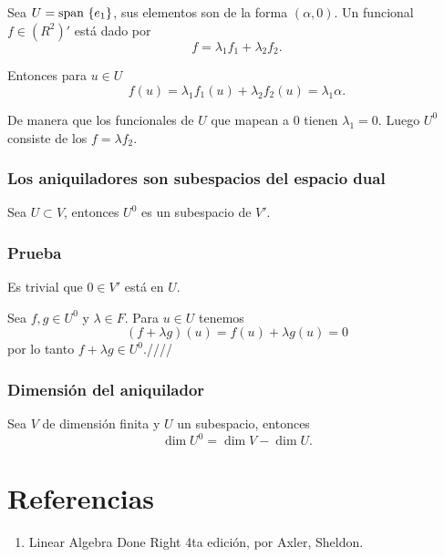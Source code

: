 \documentclass{article}
\begin{document}
Sea $U=\text{span }\{e_1\}$, sus elementos son de la forma $(\alpha,0)$.
Un funcional $f\in (R^2)'$ está dado por
$$f=\lambda_1 f_1 + \lambda_2 f_2.$$

Entonces para $u\in U$
$$f(u)=\lambda_1 f_1(u) + \lambda_2 f_2(u) = \lambda_1\alpha.$$

De manera que los funcionales de $U$ que mapean a $0$ tienen 
$\lambda_1=0$. Luego $U^0$ consiste de los $f=\lambda f_2$.
\newpage

\subsubsection{Los aniquiladores son subespacios del espacio dual}
Sea $U\subset V$, entonces $U^0$ es un subespacio de $V'$.
\subsubsection*{Prueba}
Es trivial que $0\in V'$ está en $U$.

Sea $f,g\in U^0$ y $\lambda\in F$. Para $u\in U$ tenemos
$$(f+\lambda g)(u)=f(u)+\lambda g(u) = 0$$
por lo tanto $f+\lambda g \in U^0$.\hfill ////

\subsubsection{Dimensión del aniquilador}
Sea $V$ de dimensión finita y $U$ un subespacio, entonces
$$\dim U^0 = \dim V - \dim U.$$

\newpage
\section*{Referencias}
\begin{enumerate}
    \item Linear Algebra Done Right 4ta edición, por Axler, Sheldon.
\end{enumerate}
\end{document}
